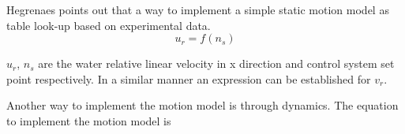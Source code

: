 \documentclass[12pt]{dalcsthesis}
\begin{document}
Hegrenaes \cite{Hallingstad2007} points out that a way to implement a simple static motion model as table look-up based on experimental data. 
\begin{equation}
\label{eq:static AUV model}
u_{r}=f(n_{s})
\end{equation}


$u_{r}$, $n_{s}$ are the water relative linear velocity in x direction and control system set point respectively. In a similar manner an expression can be established for $v_{r}$.

Another way to implement the motion model is through dynamics. The equation to implement the motion model is \cite{Thor}

\end{document}
